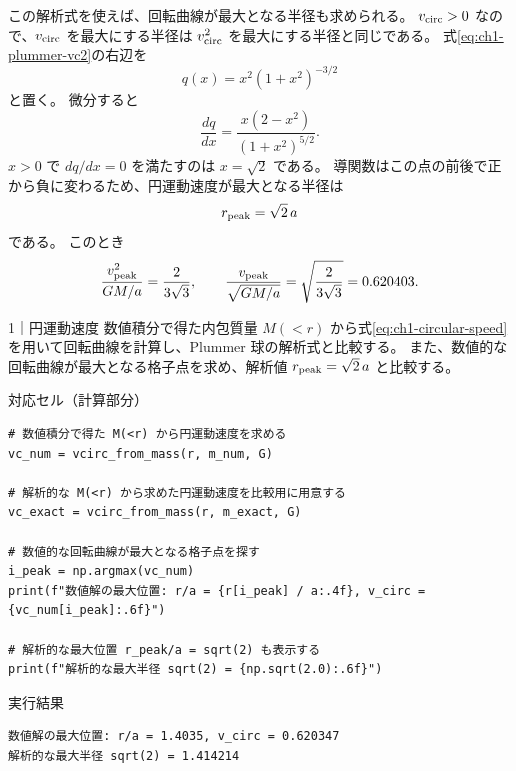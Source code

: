 この解析式を使えば、回転曲線が最大となる半径も求められる。
$v_{\rm circ}>0$ なので、$v_{\rm circ}$ を最大にする半径は $v_{\rm circ}^2$ を最大にする半径と同じである。
式\eqref{eq:ch1-plummer-vc2}の右辺を
\begin{equation}
 q(x)=x^2(1+x^2)^{-3/2}
\label{eq:ch1-qx}
\end{equation}
と置く。
微分すると
\begin{equation}
 \frac{dq}{dx}
 =\frac{x(2-x^2)}{(1+x^2)^{5/2}}.
\label{eq:ch1-q-prime}
\end{equation}
$x>0$ で $dq/dx=0$ を満たすのは $x=\sqrt{2}$ である。
導関数はこの点の前後で正から負に変わるため、円運動速度が最大となる半径は
\begin{equation}
 r_{\rm peak}=\sqrt{2}\,a
\label{eq:ch1-vc-peak-radius}
\end{equation}
である。
このとき
\begin{equation}
 \frac{v_{\rm peak}^2}{GM/a}
 =\frac{2}{3\sqrt{3}},
 \qquad
 \frac{v_{\rm peak}}{\sqrt{GM/a}}
 =\sqrt{\frac{2}{3\sqrt{3}}}
 =0.620403.
\label{eq:ch1-vc-peak-value}
\end{equation}

\begin{notebookblock}{1｜円運動速度}
数値積分で得た内包質量 $M(<r)$ から式\eqref{eq:ch1-circular-speed}を用いて回転曲線を計算し、Plummer 球の解析式と比較する。
また、数値的な回転曲線が最大となる格子点を求め、解析値 $r_{\rm peak}=\sqrt{2}\,a$ と比較する。

{\sffamily\small\color{graytext}対応セル（計算部分）}
\begin{Verbatim}[xleftmargin=2mm,fontsize=\small,frame=single,framesep=1.8mm,framerule=0.35pt,rulecolor=\color{listingframe},fillcolor=\color{listingbg}]
# 数値積分で得た M(<r) から円運動速度を求める
vc_num = vcirc_from_mass(r, m_num, G)

# 解析的な M(<r) から求めた円運動速度を比較用に用意する
vc_exact = vcirc_from_mass(r, m_exact, G)

# 数値的な回転曲線が最大となる格子点を探す
i_peak = np.argmax(vc_num)
print(f"数値解の最大位置: r/a = {r[i_peak] / a:.4f}, v_circ = {vc_num[i_peak]:.6f}")

# 解析的な最大位置 r_peak/a = sqrt(2) も表示する
print(f"解析的な最大半径 sqrt(2) = {np.sqrt(2.0):.6f}")
\end{Verbatim}

{\sffamily\small\color{graytext}実行結果}
\begin{Verbatim}[numbers=none,fontsize=\small]
数値解の最大位置: r/a = 1.4035, v_circ = 0.620347
解析的な最大半径 sqrt(2) = 1.414214
\end{Verbatim}
\end{notebookblock}

